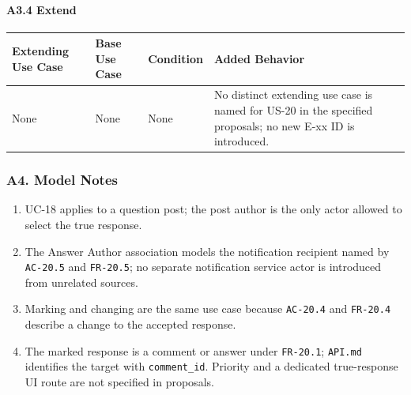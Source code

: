 \documentclass[12pt]{article}
\renewcommand{\baselinestretch}{1.5}
\begin{document}
\hypertarget{sec:a3-4-extend}{}
\paragraph*{A3.4 Extend}
\par\medskip

\begingroup
\small
\renewcommand{\baselinestretch}{1.0}\selectfont
\renewcommand{\arraystretch}{1.15}
\setlength{\tabcolsep}{6pt}
\begin{longtable}{|>{\raggedright\arraybackslash}p{}|>{\raggedright\arraybackslash}p{}|>{\raggedright\arraybackslash}p{}|>{\raggedright\arraybackslash}p{}|}
\hline
\textbf{Extending Use Case} & \textbf{Base Use Case} & \textbf{Condition} & \textbf{Added Behavior} \\ \hline
\endhead
None & None & None & No distinct extending use case is named for US-20 in the specified proposals; no new E-xx ID is introduced. \\ \hline
\end{longtable}
\endgroup
\par\medskip

\hypertarget{sec:a4-model-notes}{}
\subsubsection*{A4. Model Notes}
\par\medskip

\begin{enumerate}
\item UC-18 applies to a question post; the post author is the only actor allowed to select the true response.
\item The Answer Author association models the notification recipient named by \texttt{AC-20.5} and \texttt{FR-20.5}; no separate notification service actor is introduced from unrelated sources.
\item Marking and changing are the same use case because \texttt{AC-20.4} and \texttt{FR-20.4} describe a change to the accepted response.
\item The marked response is a comment or answer under \texttt{FR-20.1}; \texttt{API.md} identifies the target with \texttt{comment\_id}. Priority and a dedicated true-response UI route are not specified in proposals.
\end{enumerate}
\par\medskip
\end{document}
